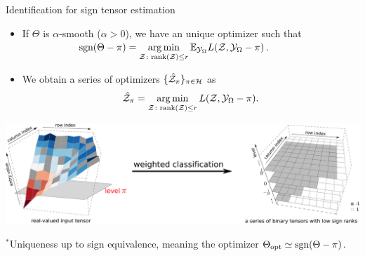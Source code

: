 \documentclass[10pt, mathserif]{beamer} %
\theoremstyle{definition}
\theoremstyle{plain}
\def\sign{\textup{sgn}}
\begin{document}
\begin{frame}{Identification for sign tensor estimation}
   \begin{itemize}
    \item If $\Theta$ is $\alpha$-smooth ($\alpha>0$), we have {\color{red}an unique optimizer}  such that\\[.1cm]
       $\hspace{2cm}\text{sgn}(\Theta-\pi) = \operatorname*{arg\,min}\limits_{\mathcal{Z}\colon \text{rank}(\mathcal{Z})\leq r} \mathbb{E}_{\mathcal{Y}_\Omega}L(\mathcal{Z},\mathcal{Y}_\Omega-\pi)$.\vspace*{.1cm}

    \item We obtain a series of optimizers $\{\hat {\mathcal{Z}}_\pi\}_{\pi\in\mathcal{H}}$ as
    \begin{align}
        \hat {\mathcal{Z}}_\pi = \operatorname*{arg\,min}_{\mathcal{Z}\colon \text{rank}(\mathcal{Z})\leq r}L(\mathcal{Z},\mathcal{Y}_\Omega-\pi).
    \end{align}
    \end{itemize}
 \vspace{-.2cm} 
 
     \begin{center}
 \includegraphics[width = \textwidth]{Figures/weightedclassification.pdf}
 \end{center}
 
     
     \vspace{-.4cm}
 {\hfill \tiny  $^*$Uniqueness up to sign equivalence, meaning the optimizer $\Theta_{\text{opt}} \simeq \sign(\Theta-\pi)$.}
\end{frame}
\end{document}

